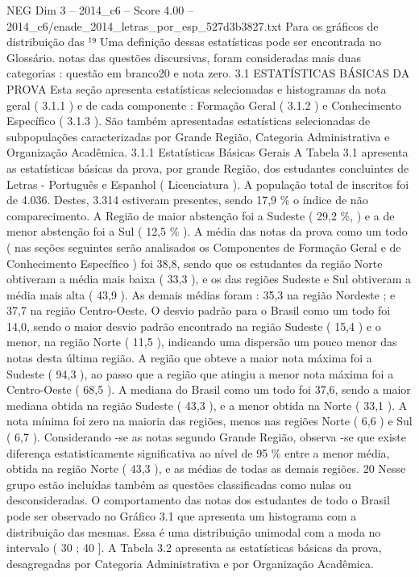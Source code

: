 \begin{textsample}{NEG Dim 3 – 2014\_c6 – Score 4.00 – 2014\_c6/enade\_2014\_letras\_por\_esp\_527d3b3827.txt}
Para os gráficos de distribuição das ¹⁹ Uma definição dessas estatísticas pode ser encontrada no Glossário. notas das questões discursivas, foram consideradas mais duas categorias : questão em branco20 e nota zero. 3.1 ESTATÍSTICAS BÁSICAS DA PROVA Esta seção apresenta estatísticas selecionadas e histogramas da nota geral ( 3.1.1 ) e de cada componente : Formação Geral ( 3.1.2 ) e Conhecimento Específico ( 3.1.3 ).
São também apresentadas estatísticas selecionadas de subpopulações caracterizadas por Grande Região, Categoria Administrativa e Organização Acadêmica. 3.1.1 Estatísticas Básicas Gerais A Tabela 3.1 apresenta as estatísticas básicas da prova, por grande Região, dos estudantes concluintes de Letras - Português e Espanhol ( Licenciatura ).
A população total de inscritos foi de 4.036.
Destes, 3.314 estiveram presentes, sendo 17,9 \% o índice de não comparecimento.
A Região de maior abstenção foi a Sudeste ( 29,2 \%, ) e a de menor abstenção foi a Sul ( 12,5 \% ).
A média das notas da prova como um todo ( nas seções seguintes serão analisados os Componentes de Formação Geral e de Conhecimento Específico ) foi 38,8, sendo que os estudantes da região Norte obtiveram a média mais baixa ( 33,3 ), e os das regiões Sudeste e Sul obtiveram a média mais alta ( 43,9 ).
As demais médias foram : 35,3 na região Nordeste ; e 37,7 na região Centro-Oeste.
O desvio padrão para o Brasil como um todo foi 14,0, sendo o maior desvio padrão encontrado na região Sudeste ( 15,4 ) e o menor, na região Norte ( 11,5 ), indicando uma dispersão um pouco menor das notas desta última região.
A região que obteve a maior nota máxima foi a Sudeste ( 94,3 ), ao passo que a região que atingiu a menor nota máxima foi a Centro-Oeste ( 68,5 ).
A mediana do Brasil como um todo foi 37,6, sendo a maior mediana obtida na região Sudeste ( 43,3 ), e a menor obtida na Norte ( 33,1 ).
A nota mínima foi zero na maioria das regiões, menos nas regiões Norte ( 6,6 ) e Sul ( 6,7 ).
Considerando -se as notas segundo Grande Região, observa -se que existe diferença estatisticamente significativa ao nível de 95 \% entre a menor média, obtida na região Norte ( 43,3 ), e as médias de todas as demais regiões. 20 Nesse grupo estão incluídas também as questões classificadas como nulas ou desconsideradas.
O comportamento das notas dos estudantes de todo o Brasil pode ser observado no Gráfico 3.1 que apresenta um histograma com a distribuição das mesmas.
Essa é uma distribuição unimodal com a moda no intervalo ( 30 ; 40 ].
A Tabela 3.2 apresenta as estatísticas básicas da prova, desagregadas por Categoria Administrativa e por Organização Acadêmica.

\end{textsample}
